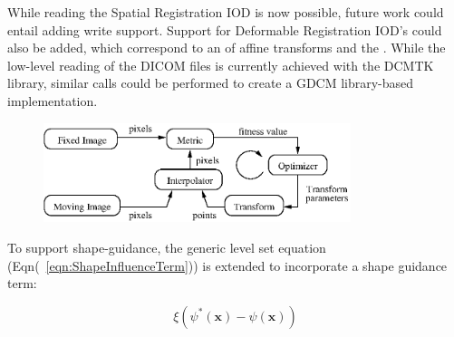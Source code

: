 \documentclass{InsightArticle}
\begin{document}
While reading the Spatial Registration IOD is now possible, future work could
entail adding write support. Support for Deformable Registration IOD's could
also be added, which correspond to an  of affine
transforms and the .  While the low-level
reading of the DICOM files is currently achieved with the DCMTK library, similar
calls could be performed to create a GDCM library-based implementation.





%
%

\begin{figure}
\center
\includegraphics[width=0.8\textwidth]{RegistrationComponentsDiagram.eps}
\label{fig:RegistrationComponents}
\end{figure}



%
%


To support shape-guidance, the generic level set equation
(Eqn(~\ref{eqn:ShapeInfluenceTerm})) is extended to incorporate a shape guidance
term:

\begin{equation}
\label{eqn:ShapeInfluenceTerm}
\xi \left(\psi^{*}(\mathbf{x}) - \psi(\mathbf{x})\right)
\end{equation}




%
%



\end{document}
